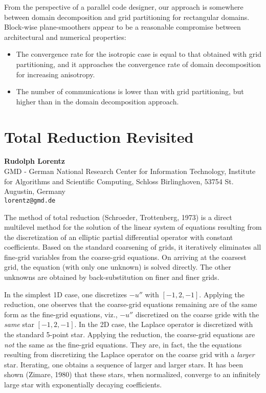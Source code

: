 \documentclass[11pt]{article}
\newcommand{\nextab}[4]{
	\section{#2}
	{\bf #1} \\ \nopagebreak
	{#3} \\ \nopagebreak
	{\tt #4} \nopagebreak
	}
\begin{document}
From the perspective of a parallel code designer, our
approach is somewhere between domain decomposition and grid partitioning
for rectangular domains. Block-wise plane-smoothers appear to be a reasonable
compromise between architectural and numerical properties:
\begin{itemize}
\item
	The convergence rate for the isotropic case is equal to that
	obtained with grid partitioning, and it approaches the convergence
	rate of domain decomposition for increasing anisotropy.
\item
	The number of communications is lower than with grid partitioning,
	but higher than in the domain decomposition approach.
\end{itemize}


\pagebreak


\nextab{Rudolph Lorentz}
	{Total Reduction Revisited}
	{GMD - German National Research Center for Information Technology,
	Institute for Algorithms and Scientific Computing,
	Schloss Birlinghoven, 53754 St. Augustin, Germany}
	{lorentz@gmd.de}

The method of total reduction (Schroeder, Trottenberg, 1973)
is a direct multilevel method for the solution of the linear
system of equations resulting from the discretization of an elliptic
partial differential operator with constant coefficients. Based on the
standard coarsening of grids, it iteratively eliminates all fine-grid
variables from the coarse-grid equations. On arriving at the coarsest grid,
the equation (with only one unknown) is solved directly. The other
unknowns are obtained by back-substitution on finer and finer grids.

In the simplest 1D case, one discretizes $-u''$ with $[-1, 2, -1]$.
Applying the reduction, one observes that the coarse-grid equations
remaining are of the same form as the fine-grid equations, viz.,
$-u''$ discretized on the coarse gride with the {\em same} star
$[-1, 2, -1]$.
In the 2D case,
the Laplace operator is discretized with the standard 5-point star.
Applying the reduction, the coarse-grid equations are {\em not} the
same as the fine-grid equations. They are, in fact, the the equations
resulting from discretizing the Laplace operator on the coarse grid
with a {\em larger} star. Iterating, one obtains a sequence of larger
and larger stars. It has been shown (Zimare, 1980) that these stars,
when normalized, converge to an infinitely large star with exponentially
decaying coefficients.
\end{document}
